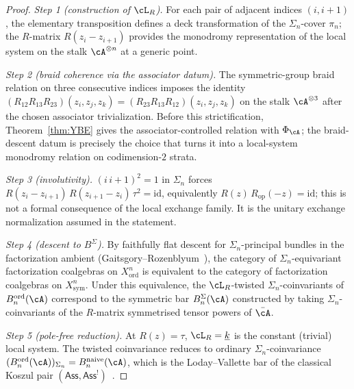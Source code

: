 \begin{proof}
\textit{Step 1 (construction of $\cL_R$).} For each pair of
adjacent indices $(i, i{+}1)$, the elementary transposition
defines a deck transformation of the $\Sigma_n$-cover
$\pi_n$; the $R$-matrix $R(z_i - z_{i+1})$ provides the
monodromy representation of the local system on the stalk
$\cA^{\otimes n}$ at a generic point.

\textit{Step 2 (braid coherence via the associator datum).} The symmetric-group
braid relation on three consecutive indices imposes the
identity
$(R_{12} R_{13} R_{23})(z_i, z_j, z_k)
 = (R_{23} R_{13} R_{12})(z_i, z_j, z_k)$
on the stalk $\cA^{\otimes 3}$ after the chosen associator
trivialization.  Before this strictification, Theorem~\ref{thm:YBE}
gives the associator-controlled relation with \(\Phi_\cA\); the
braid-descent datum is precisely the choice that turns it into a
local-system monodromy relation on codimension-$2$ strata.

\textit{Step 3 (involutivity).} $(i\,i{+}1)^2 = 1$ in $\Sigma_n$
forces $R(z_i - z_{i+1})\,R(z_{i+1} - z_i)\,\tau^2 = \mathrm{id}$,
equivalently $R(z)\,R_{\mathrm{op}}(-z) = \mathrm{id}$; this is not a
formal consequence of the local exchange family. It is the unitary
exchange normalization assumed in the statement.

\textit{Step 4 (descent to $B^\Sigma$).} By faithfully flat descent
for $\Sigma_n$-principal bundles in the factorization ambient
(Gaitsgory--Rozenblyum~\cite[IV.5.4]{GR17}), the category of
$\Sigma_n$-equivariant factorization coalgebras on
$X^n_{\mathrm{ord}}$ is equivalent to the category of
factorization coalgebras on $X^n_{\mathrm{sym}}$. Under this
equivalence, the $\cL_R$-twisted $\Sigma_n$-coinvariants of
$B^{\mathrm{ord}}_n(\cA)$ correspond to the symmetric bar
$B^{\Sigma}_n(\cA)$ constructed by taking $\Sigma_n$-coinvariants
of the $R$-matrix symmetrised tensor powers of $\bar\cA$.

\textit{Step 5 (pole-free reduction).} At $R(z) = \tau$,
$\cL_R = \underline{k}$ is the constant (trivial) local system.
The twisted coinvariance reduces to ordinary
$\Sigma_n$-coinvariance
$(B^{\mathrm{ord}}_n(\cA))_{\Sigma_n} = B^{\mathrm{naive}}_n(\cA)$,
which is the Loday--Vallette bar of the classical Koszul pair
$(\mathsf{Ass}, \mathsf{Ass}^!)$~\cite{LV12}.
\end{proof}

